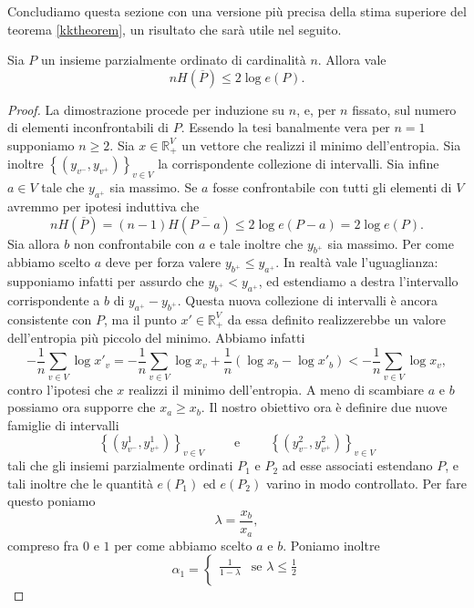 Concludiamo questa sezione con una versione più precisa della stima superiore del teorema \ref{kktheorem}, un risultato che sarà utile nel seguito. 
\begin{theorem}
	 \label{cfjjmtheorem} Sia \(P\) un insieme parzialmente ordinato di cardinalità \(n\). Allora vale
	\[nH\left(\overline{P}\right)\le 2\log{e(P)}.\]
\end{theorem}
\begin{proof}
	La dimostrazione procede per induzione su \(n\), e, per \(n\) fissato, sul numero di elementi inconfrontabili di \(P\). Essendo la tesi banalmente vera per \(n=1\) supponiamo \(n\ge 2\). Sia \(x\in \mathbb{R}_{+}^{V}\) un vettore che realizzi il minimo dell'entropia. Sia inoltre \(\left\{\left(y_{v^-},y_{v^+}\right)\right\}_{v\in V}\) la corrispondente collezione di intervalli. Sia infine \(a\in V\) tale che \(y_{a^+}\) sia massimo. Se \(a\) fosse confrontabile con tutti gli elementi di \(V\) avremmo per ipotesi induttiva che
	\[nH\left(\overline{P}\right)=(n-1)H\left(\overline{P-a}\right)\le 2\log{e(P-a)=2\log{e(P)}}.\]
	Sia allora \(b\) non confrontabile con \(a\) e tale inoltre che \(y_{b^+}\) sia massimo. Per come abbiamo scelto \(a\) deve per forza valere \(y_{b^+}\le y_{a^+}\). In realtà vale l'uguaglianza: supponiamo infatti per assurdo che \(y_{b^+}<y_{a^+}\), ed estendiamo a destra l'intervallo corrispondente a \(b\) di \(y_{a^+}-y_{b^+}\). Questa nuova collezione di intervalli è ancora consistente con \(P\), ma il punto \(x'\in \mathbb{R}_{+}^{V}\) da essa definito realizzerebbe un valore dell'entropia più piccolo del minimo. Abbiamo infatti
	\[-\frac{1}{n}\sum_{v\in V}{\log{x'_{v}}}=-\frac{1}{n}\sum_{v\in V}{\log{x_{v}}}+\frac{1}{n}\left(\log{x_b}-\log{x'_{b}}\right)<-\frac{1}{n}\sum_{v\in V}{\log{x_v}},\]
	contro l'ipotesi che \(x\) realizzi il minimo dell'entropia. A meno di scambiare \(a\) e \(b\) possiamo ora supporre che \(x_a\ge x_b\). Il nostro obiettivo ora è definire due nuove famiglie di intervalli
	\[\left\{\left(y_{v^-}^1, y_{v^+}^1\right)\right\}_{v\in V}\qquad\mbox{ e }\qquad\left\{\left(y_{v^-}^2, y_{v^+}^2\right)\right\}_{v\in V}\]
	tali che gli insiemi parzialmente ordinati \(P_1\) e \(P_2\) ad esse associati estendano \(P\), e tali inoltre che le quantità \(e(P_1)\) ed \(e(P_2)\) varino in modo controllato. Per fare questo poniamo
	\[\lambda=\frac{x_b}{x_a},\]
	compreso fra \(0\) e \(1\) per come abbiamo scelto \(a\) e \(b\). Poniamo inoltre
	\[\alpha_1= 
	\begin{cases}
		\frac{1}{1-\lambda} & \mbox{se } \lambda\le\frac{1}{2} \\

\end{cases}\]
\end{proof}
